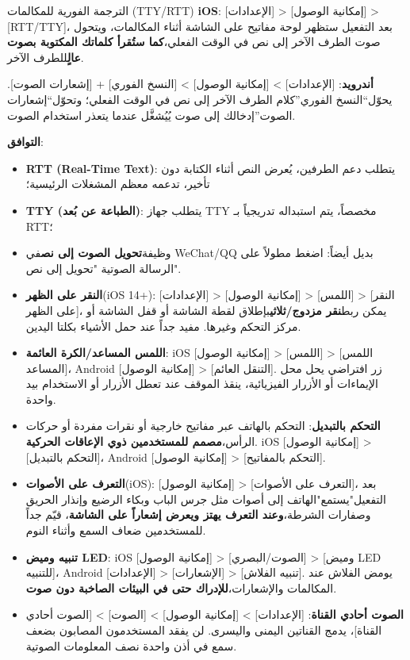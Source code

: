 \begin{tcbinfo}{الترجمة الفورية للمكالمات (TTY/RTT)}
\textbf{iOS}: [الإعدادات] > [إمكانية الوصول] > [RTT/TTY]، بعد التفعيل ستظهر لوحة مفاتيح على الشاشة أثناء المكالمات، ويتحول صوت الطرف الآخر إلى نص في الوقت الفعلي،\textbf{كما ستُقرأ كلماتك المكتوبة بصوت عالٍ}للطرف الآخر.

\textbf{أندرويد}: [الإعدادات] > [إمكانية الوصول] > [النسخ الفوري] + [إشعارات الصوت]. يحوّل“النسخ الفوري”كلام الطرف الآخر إلى نص في الوقت الفعلي؛ وتحوّل“إشعارات الصوت”إدخالك إلى صوت يُيُشغَّل عندما يتعذر استخدام الصوت.

\textbf{التوافق}:

\begin{itemize}
  \item \textbf{RTT (Real-Time Text)}: يتطلب دعم الطرفين، يُعرض النص أثناء الكتابة دون تأخير، تدعمه معظم المشغلات الرئيسية؛
  \item \textbf{TTY (الطباعة عن بُعد)}: يتطلب جهاز TTY مخصصاً، يتم استبداله تدريجياً بـ RTT؛
  \item وظيفة\textbf{تحويل الصوت إلى نص}في WeChat/QQ بديل أيضاً: اضغط مطولاً على الرسالة الصوتية "تحويل إلى نص".
\end{itemize}

\end{tcbinfo}


\begin{itemize}
  \item \textbf{النقر على الظهر}(iOS 14+): [الإعدادات] > [إمكانية الوصول] > [اللمس] > [النقر على الظهر]، يمكن ربط\textbf{نقر مزدوج/ثلاثي}بإطلاق لقطة الشاشة أو قفل الشاشة أو مركز التحكم وغيرها. مفيد جداً عند حمل الأشياء بكلتا اليدين.
  \item \textbf{اللمس المساعد/الكرة العائمة}: iOS [إمكانية الوصول] > [اللمس] > [اللمس المساعد]، Android [إمكانية الوصول] > [التنقل العائم]. زر افتراضي يحل محل الإيماءات أو الأزرار الفيزيائية، ينقذ الموقف عند تعطل الأزرار أو الاستخدام بيد واحدة.
  \item \textbf{التحكم بالتبديل}: التحكم بالهاتف عبر مفاتيح خارجية أو نقرات مفردة أو حركات الرأس،\textbf{مصمم للمستخدمين ذوي الإعاقات الحركية}. iOS [إمكانية الوصول] > [التحكم بالتبديل]، Android [إمكانية الوصول] > [التحكم بالمفاتيح].
  \item \textbf{التعرف على الأصوات}(iOS): [إمكانية الوصول] > [التعرف على الأصوات]، بعد التفعيل"يستمع"الهاتف إلى أصوات مثل جرس الباب وبكاء الرضيع وإنذار الحريق وصفارات الشرطة،\textbf{وعند التعرف يهتز ويعرض إشعاراً على الشاشة}، قيّم جداً للمستخدمين ضعاف السمع وأثناء النوم.
  \item \textbf{تنبيه وميض LED}: iOS [إمكانية الوصول] > [الصوت/البصري] > [وميض LED للتنبيه]، Android [الإعدادات] > [الإشعارات] > [تنبيه الفلاش]. يومض الفلاش عند المكالمات والإشعارات،\textbf{للإدراك حتى في البيئات الصاخبة دون صوت}.
  \item \textbf{الصوت أحادي القناة}: [الإعدادات] > [إمكانية الوصول] > [الصوت] > [الصوت أحادي القناة]، يدمج القناتين اليمنى واليسرى. لن يفقد المستخدمون المصابون بضعف سمع في أذن واحدة نصف المعلومات الصوتية.
\end{itemize}

